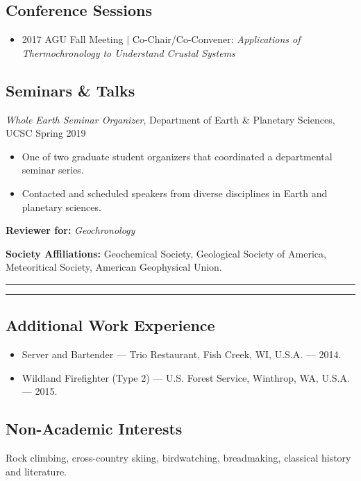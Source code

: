 \documentclass[10pt]{article}
\begin{document}
\subsection*{\textbf{Conference Sessions}}
\begin{itemize}
	\item 2017 AGU Fall Meeting $|$ Co-Chair/Co-Convener: \textit{Applications of Thermochronology to Understand Crustal Systems}
\end{itemize}

\subsection*{\textbf{Seminars \& Talks}}
\textit{Whole Earth Seminar Organizer}, Department of Earth \& Planetary Sciences, UCSC \hfill  Spring 2019
\begin{itemize}
	\item One of two graduate student organizers that coordinated a departmental seminar series.
	\item Contacted and scheduled speakers from diverse disciplines in Earth and planetary sciences.
\end{itemize}

\vspace{2ex}
\begin{hangparas}{5ex}{1}
	\textbf{Reviewer for:} \textit{Geochronology}

	\vspace{2ex}
	\textbf{Society Affiliations:} Geochemical Society, Geological Society of America, Meteoritical Society, American Geophysical Union.
\end{hangparas}

\begin{center}{\rule{2.5in}{0.5pt}}\end{center}  \begin{center}{\rule{2.5in}{0.5pt}}\end{center}
	
\subsection*{\textbf{Additional Work Experience}}
\begin{itemize}[label={}]
	\item Server and Bartender --- Trio Restaurant, Fish Creek, WI, U.S.A. --- 2014.
	\item Wildland Firefighter (Type 2) --- U.S. Forest Service, Winthrop, WA, U.S.A. --- 2015.
\end{itemize}


\subsection*{\textbf{Non-Academic Interests}} \hspace{5ex}
 Rock climbing, cross-country skiing, birdwatching, breadmaking, classical history and literature.

\end{document}
